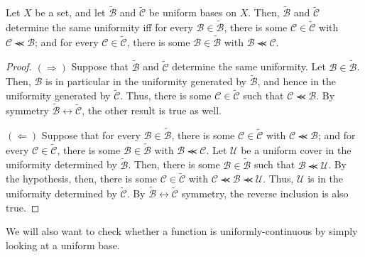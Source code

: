 \begin{prp}\label{prp1.6}
Let $X$ be a set, and let $\widetilde{\mathcal{B}}$ and $\widetilde{\mathcal{C}}$ be uniform bases on $X$.  Then, $\widetilde{\mathcal{B}}$ and $\widetilde{\mathcal{C}}$ determine the same uniformity iff for every $\mathcal{B}\in \widetilde{\mathcal{B}}$, there is some $\mathcal{C}\in \widetilde{\mathcal{C}}$ with $\mathcal{C}\llcurly \mathcal{B}$; and for every $\mathcal{C}\in \widetilde{\mathcal{C}}$, there is some $\mathcal{B}\in \widetilde{\mathcal{B}}$ with $\mathcal{B}\llcurly \mathcal{C}$.
\begin{proof}
$(\Rightarrow )$ Suppose that $\widetilde{\mathcal{B}}$ and $\widetilde{\mathcal{C}}$ determine the same uniformity.  Let $\mathcal{B}\in \widetilde{\mathcal{B}}$.  Then, $\mathcal{B}$ is in particular in the uniformity generated by $\widetilde{\mathcal{B}}$, and hence in the uniformity generated by $\widetilde{\mathcal{C}}$.  Thus, there is some $\mathcal{C}\in \widetilde{\mathcal{C}}$ such that $\mathcal{C}\llcurly \mathcal{B}$.  By symmetry $\widetilde{\mathcal{B}}\leftrightarrow \widetilde{\mathcal{C}}$, the other result is true as well.

\blankline
\noindent
$(\Leftarrow )$ Suppose that for every $\mathcal{B}\in \widetilde{\mathcal{B}}$, there is some $\mathcal{C}\in \widetilde{\mathcal{C}}$ with $\mathcal{C}\llcurly \mathcal{B}$; and for every $\mathcal{C}\in \widetilde{\mathcal{C}}$, there is some $\mathcal{B}\in \widetilde{\mathcal{B}}$ with $\mathcal{B}\llcurly \mathcal{C}$.  Let $\mathcal{U}$ be a uniform cover in the uniformity determined by $\widetilde{\mathcal{B}}$.  Then, there is some $\mathcal{B}\in \widetilde{\mathcal{B}}$ such that $\mathcal{B}\llcurly \mathcal{U}$.  By the hypothesis, then, there is some $\mathcal{C}\in \widetilde{\mathcal{C}}$ with $\mathcal{C}\llcurly \mathcal{B}\llcurly \mathcal{U}$.  Thus, $\mathcal{U}$ is in the uniformity determined by $\widetilde{\mathcal{C}}$.  By $\widetilde{\mathcal{B}}\leftrightarrow \widetilde{\mathcal{C}}$ symmetry, the reverse inclusion is also true.
\end{proof}
\end{prp}
We will also want to check whether a function is uniformly-continuous by simply looking at a uniform base.
